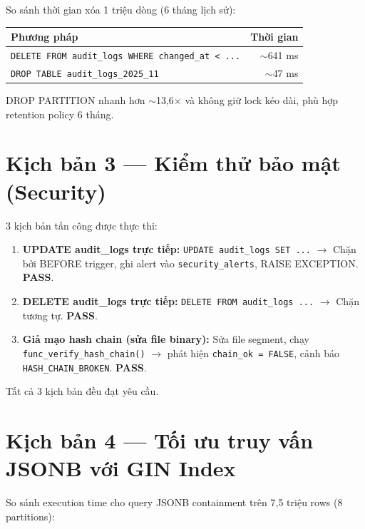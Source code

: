 So sánh thời gian xóa 1 triệu dòng (6 tháng lịch sử):

\begin{center}
\centering
{}
\label{tab:ks2-drop}
\begin{tabularx}{\textwidth}{Xr}
\toprule
\textbf{Phương pháp} & \textbf{Thời gian} \\
\midrule
\texttt{DELETE FROM audit\_logs WHERE changed\_at < ...} & $\sim$641 ms \\
\texttt{DROP TABLE audit\_logs\_2025\_11} & $\sim$47 ms \\
\bottomrule
\end{tabularx}
\end{center}

DROP PARTITION nhanh hơn $\sim$13,6$\times$ và không giữ lock kéo dài, phù hợp retention policy 6 tháng.

\section{Kịch bản 3 --- Kiểm thử bảo mật (Security)}

3 kịch bản tấn công được thực thi:

\begin{sloppypar}
\begin{enumerate}
    \item \textbf{UPDATE audit\_logs trực tiếp:} \texttt{UPDATE audit\_logs SET ...} $\rightarrow$ Chặn bởi BEFORE trigger, ghi alert vào \texttt{security\_alerts}, RAISE EXCEPTION. \textbf{PASS}.
    \item \textbf{DELETE audit\_logs trực tiếp:} \texttt{DELETE FROM audit\_logs ...} $\rightarrow$ Chặn tương tự. \textbf{PASS}.
    \item \textbf{Giả mạo hash chain (sửa file binary):} Sửa file segment, chạy \texttt{func\_verify\_hash\_chain()} $\rightarrow$ phát hiện \texttt{chain\_ok\allowbreak{} = FALSE}, cảnh báo \texttt{HASH\_\allowbreak{}CHAIN\_\allowbreak{}BROKEN}. \textbf{PASS}.
\end{enumerate}
\end{sloppypar}

Tất cả 3 kịch bản đều đạt yêu cầu.

\section{Kịch bản 4 --- Tối ưu truy vấn JSONB với GIN Index}

So sánh execution time cho query JSONB containment trên 7,5 triệu rows (8 partitions):

